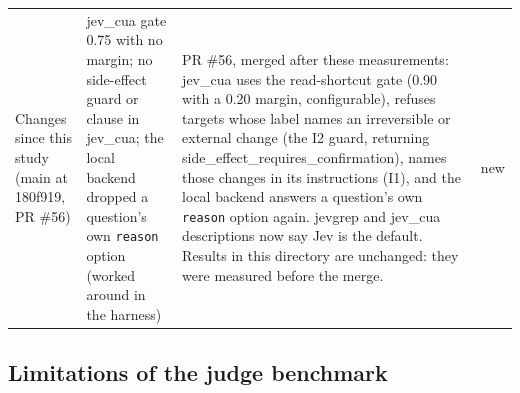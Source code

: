 \documentclass[11pt,letterpaper]{article}
\newcommand{\vnew}{\textcolor{okgray}{\textsf{new}}}
\begin{document}
{\begin{xltabular}{\textwidth}{@{}>{\raggedright\arraybackslash}p{0.2\textwidth} >{\raggedright\arraybackslash}p{0.15\textwidth} >{\raggedright\arraybackslash}X l@{}}
Changes since this study (main at 180f919, PR \#56) & jev\_\allowbreak{}cua gate 0.75 with no margin; no side-effect guard or clause in jev\_\allowbreak{}cua; the local backend dropped a question's own \texttt{reason} option (worked around in the harness) & PR \#56, merged after these measurements: jev\_\allowbreak{}cua uses the read-shortcut gate (0.90 with a 0.20 margin, configurable), refuses targets whose label names an irreversible or external change (the I2 guard, returning side\_\allowbreak{}effect\_\allowbreak{}requires\_\allowbreak{}confirmation), names those changes in its instructions (I1), and the local backend answers a question's own \texttt{reason} option again. jevgrep and jev\_\allowbreak{}cua descriptions now say Jev is the default. Results in this directory are unchanged: they were measured before the merge. & \vnew \\
\end{xltabular}
 \FloatBarrier
}
\subsection{Limitations of the judge benchmark}\label{jb:sec:limits}
\end{document}
